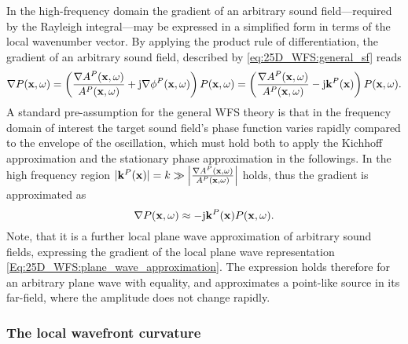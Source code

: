 In the high-frequency domain the gradient of an arbitrary sound field---required by the Rayleigh integral---may be expressed in a simplified form in terms of the local wavenumber vector.
By applying the product rule of differentiation, the gradient of an arbitrary sound field, described by \eqref{eq:25D_WFS:general_sf} reads
\begin{equation}
\nabla P(\mathbf{x},\omega) = \left(  \frac{\nabla A^P(\mathbf{x},\omega)}{A^P(\mathbf{x},\omega)} + \mathrm{j} \nabla \phi^P(\mathbf{x},\omega) \right) P(\mathbf{x},\omega) =  \left(  \frac{\nabla A^P(\mathbf{x},\omega)}{A^P(\mathbf{x},\omega)} - \mathrm{j} \mathbf{k}^P(\mathbf{x}) \right) P(\mathbf{x},\omega).
\end{equation}
A standard pre-assumption for the general WFS theory is that in the frequency domain of interest the target sound field's phase function varies rapidly compared to the envelope of the oscillation, which must hold both to apply the Kichhoff approximation and the stationary phase approximation in the followings.
In the high frequency region $|\mathbf{k}^P(\mathbf{x})| = k \gg \left| \frac{ \nabla A^P(\mathbf{x},\omega)}{A^P(\mathbf{x},\omega)} \right|$ holds, thus the gradient is approximated as
\begin{equation}
\nabla P(\mathbf{x},\omega) \approx - \mathrm{j} \mathbf{k}^P(\mathbf{x}) P(\mathbf{x},\omega).
\label{eq:25D_WFS:gradient_appr}
\end{equation}
Note, that it is a further local plane wave approximation of arbitrary sound fields, expressing the gradient of the local plane wave representation \eqref{Eq:25D_WFS:plane_wave_approximation}.
The expression holds therefore for an arbitrary plane wave with equality, and approximates a point-like source in its far-field, where the amplitude does not change rapidly.

\subsubsection{The local wavefront curvature}


